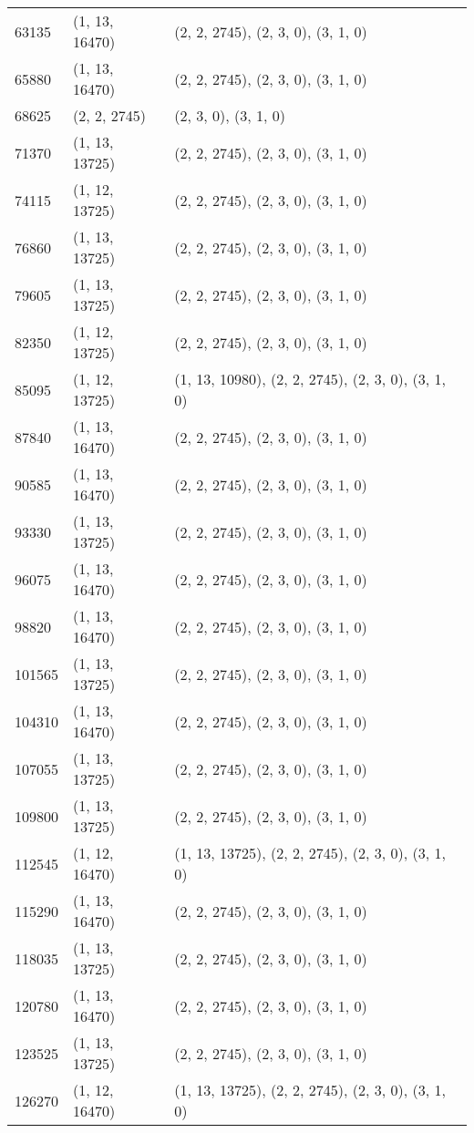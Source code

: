 \documentclass[notitlepage,openany]{book}
\begin{document}
\begin{center}
\begin{longtable}{|l|l|l|}
        63135 & (1, 13, 16470) & (2, 2, 2745), (2, 3, 0), (3, 1, 0) \\
        65880 & (1, 13, 16470) & (2, 2, 2745), (2, 3, 0), (3, 1, 0) \\
        68625 & (2, 2, 2745) & (2, 3, 0), (3, 1, 0) \\
        71370 & (1, 13, 13725) & (2, 2, 2745), (2, 3, 0), (3, 1, 0) \\
        74115 & (1, 12, 13725) & (2, 2, 2745), (2, 3, 0), (3, 1, 0) \\
        76860 & (1, 13, 13725) & (2, 2, 2745), (2, 3, 0), (3, 1, 0) \\
        79605 & (1, 13, 13725) & (2, 2, 2745), (2, 3, 0), (3, 1, 0) \\
        82350 & (1, 12, 13725) & (2, 2, 2745), (2, 3, 0), (3, 1, 0) \\
        85095 & (1, 12, 13725) & (1, 13, 10980), (2, 2, 2745), (2, 3, 0), (3, 1, 0) \\
        87840 & (1, 13, 16470) & (2, 2, 2745), (2, 3, 0), (3, 1, 0) \\
        90585 & (1, 13, 16470) & (2, 2, 2745), (2, 3, 0), (3, 1, 0) \\
        93330 & (1, 13, 13725) & (2, 2, 2745), (2, 3, 0), (3, 1, 0) \\
        96075 & (1, 13, 16470) & (2, 2, 2745), (2, 3, 0), (3, 1, 0) \\
        98820 & (1, 13, 16470) & (2, 2, 2745), (2, 3, 0), (3, 1, 0) \\
        101565 & (1, 13, 13725) & (2, 2, 2745), (2, 3, 0), (3, 1, 0) \\
        104310 & (1, 13, 16470) & (2, 2, 2745), (2, 3, 0), (3, 1, 0) \\
        107055 & (1, 13, 13725) & (2, 2, 2745), (2, 3, 0), (3, 1, 0) \\
        109800 & (1, 13, 13725) & (2, 2, 2745), (2, 3, 0), (3, 1, 0) \\
        112545 & (1, 12, 16470) & (1, 13, 13725), (2, 2, 2745), (2, 3, 0), (3, 1, 0) \\
        115290 & (1, 13, 16470) & (2, 2, 2745), (2, 3, 0), (3, 1, 0) \\
        118035 & (1, 13, 13725) & (2, 2, 2745), (2, 3, 0), (3, 1, 0) \\
        120780 & (1, 13, 16470) & (2, 2, 2745), (2, 3, 0), (3, 1, 0) \\
        123525 & (1, 13, 13725) & (2, 2, 2745), (2, 3, 0), (3, 1, 0) \\
        126270 & (1, 12, 16470) & (1, 13, 13725), (2, 2, 2745), (2, 3, 0), (3, 1, 0) \\

\end{longtable}
\end{center}
\end{document}

